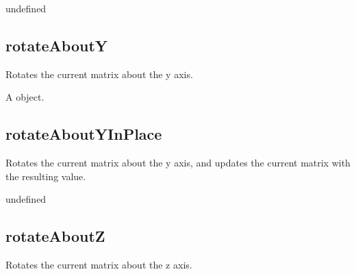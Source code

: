 \documentclass[letterpaper,12pt,english,openany,oneside]{sphinxmanual}
\begin{document}
\label{\detokenize{JS_3D_API:section-54}}\label{\detokenize{JS_3D_API:returns-49}}

undefined


\subsection{rotateAboutY}
\label{\detokenize{JS_3D_API:rotateabouty}}
Rotates the current matrix about the y axis.

\label{\detokenize{JS_3D_API:syntax-49}}

\begin{sphinxVerbatim}[commandchars=\\\{\}]
\end{sphinxVerbatim}
\label{\detokenize{JS_3D_API:parameters-36}}

\label{\detokenize{JS_3D_API:section-55}}\label{\detokenize{JS_3D_API:returns-50}}

A  object.


\subsection{rotateAboutYInPlace}
\label{\detokenize{JS_3D_API:rotateaboutyinplace}}
Rotates the current matrix about the y axis, and updates the current matrix with the resulting value.

\label{\detokenize{JS_3D_API:syntax-50}}

\begin{sphinxVerbatim}[commandchars=\\\{\}]
\end{sphinxVerbatim}
\label{\detokenize{JS_3D_API:parameters-37}}

\label{\detokenize{JS_3D_API:section-56}}\label{\detokenize{JS_3D_API:returns-51}}

undefined


\subsection{rotateAboutZ}
\label{\detokenize{JS_3D_API:rotateaboutz}}
Rotates the current matrix about the z axis.
\end{document}
